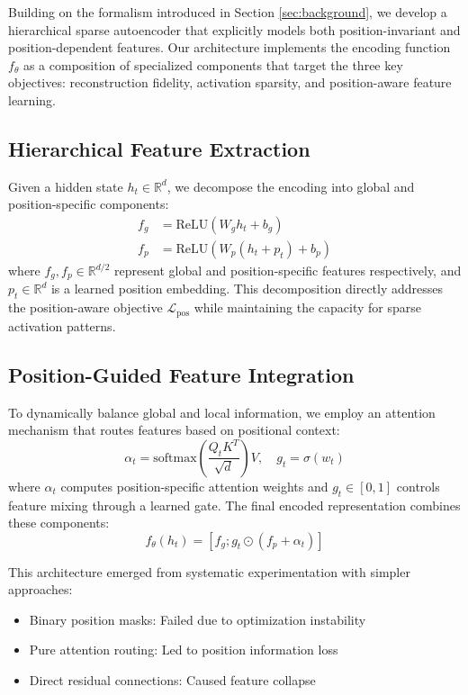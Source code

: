 \documentclass{article} %
\begin{document}
Building on the formalism introduced in Section \ref{sec:background}, we develop a hierarchical sparse autoencoder that explicitly models both position-invariant and position-dependent features. Our architecture implements the encoding function $f_\theta$ as a composition of specialized components that target the three key objectives: reconstruction fidelity, activation sparsity, and position-aware feature learning.

\subsection{Hierarchical Feature Extraction}
Given a hidden state $h_t \in \mathbb{R}^d$, we decompose the encoding into global and position-specific components:
\begin{align}
    f_g &= \text{ReLU}(W_g h_t + b_g) \\
    f_p &= \text{ReLU}(W_p(h_t + p_t) + b_p)
\end{align}
where $f_g, f_p \in \mathbb{R}^{d/2}$ represent global and position-specific features respectively, and $p_t \in \mathbb{R}^d$ is a learned position embedding. This decomposition directly addresses the position-aware objective $\mathcal{L}_\text{pos}$ while maintaining the capacity for sparse activation patterns.

\subsection{Position-Guided Feature Integration}
To dynamically balance global and local information, we employ an attention mechanism that routes features based on positional context:
\begin{equation}
    \alpha_t = \text{softmax}(\frac{Q_t K^T}{\sqrt{d}})V, \quad g_t = \sigma(w_t)
\end{equation}
where $\alpha_t$ computes position-specific attention weights and $g_t \in [0,1]$ controls feature mixing through a learned gate. The final encoded representation combines these components:
\begin{equation}
    f_\theta(h_t) = [f_g; g_t \odot (f_p + \alpha_t)]
\end{equation}

This architecture emerged from systematic experimentation with simpler approaches:
\begin{itemize}
    \item Binary position masks: Failed due to optimization instability
    \item Pure attention routing: Led to position information loss
    \item Direct residual connections: Caused feature collapse
\end{itemize}
\end{document}
